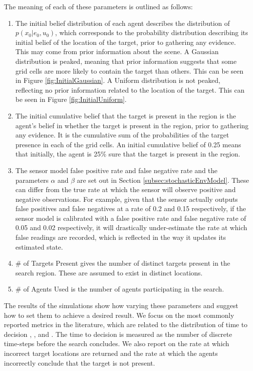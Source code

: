 The meaning of each of these parameters is outlined as follows:
\begin{enumerate}
    \item The initial belief distribution of each agent describes the distribution of $p(x_0 | e_0, u_0)$, which corresponds to the probability distribution describing its initial belief of the location of the target, prior to gathering any evidence. This may come from prior information about the scene. A Gaussian distribution is peaked, meaning that prior information suggests that some grid cells are more likely to contain the target than others. This can be seen in Figure \ref{fig:InitialGaussian}. A Uniform distribution is not peaked, reflecting no prior information related to the location of the target. This can be seen in Figure \ref{fig:InitialUniform}.
    \item The initial cumulative belief that the target is present in the region is the agent's belief in whether the target is present in the region, prior to gathering any evidence. It is the cumulative sum of the probabilities of the target presence in each of the grid cells. An initial cumulative belief of 0.25 means that initially, the agent is 25\% sure that the target is present in the region. 
    \item The sensor model false positive rate and false negative rate and the parameters $\alpha$ and $\beta$ are set out in Section \ref{subsec:stochasticEnvModel}. These can differ from the true rate at which the sensor will observe positive and negative observations. For example, given that the sensor actually outputs false positives and false negatives at a rate of 0.2 and 0.15 respectively, if the sensor model is calibrated with a false positive rate and false negative rate of 0.05 and 0.02 respectively, it will drastically under-estimate the rate at which false readings are recorded, which is reflected in the way it updates its estimated state.
    \item \# of Targets Present gives the number of distinct targets present in the search region. These are assumed to exist in distinct locations.
    \item \# of Agents Used is the number of agents participating in the search.
\end{enumerate}
The results of the simulations show how varying these parameters and suggest how to set them to achieve a desired result. We focus on the most commonly reported metrics in the literature, which are related to the distribution of time to decision \cite{Chung2012AnalysisStrategies}, \cite{Waharte2010ProbabilisticUAVs}, \cite{Waharte2010SupportingUAVs} and \cite{Lau2007OptimalEnvironments}. The time to decision is measured as the number of discrete time-steps before the search concludes. We also report on the rate at which incorrect target locations are returned and the rate at which the agents incorrectly conclude that the target is not present. 

